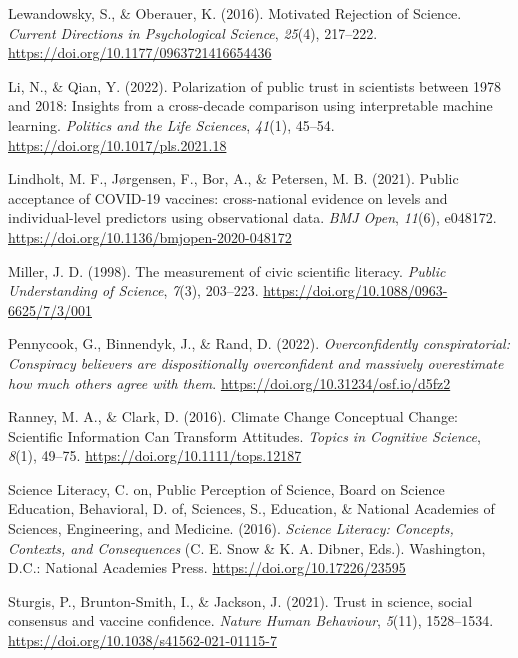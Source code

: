 \documentclass[
  doc,floatsintext]{apa6}
\newlength{\cslhangindent}
\newenvironment{CSLReferences}[2] %
 {\begin{list}{}{%
  \setlength{\itemindent}{0pt}
  \setlength{\leftmargin}{0pt}
  \setlength{\parsep}{0pt}
  \ifodd #1
   \setlength{\leftmargin}{\cslhangindent}
   \setlength{\itemindent}{-1\cslhangindent}
  \fi
  \setlength{\itemsep}{#2\baselineskip}}}
 {\end{list}}
\begin{document}
\begin{CSLReferences}{1}{0}
Lewandowsky, S., \& Oberauer, K. (2016). Motivated Rejection of Science. \emph{Current Directions in Psychological Science}, \emph{25}(4), 217--222. \url{https://doi.org/10.1177/0963721416654436}

Li, N., \& Qian, Y. (2022). Polarization of public trust in scientists between 1978 and 2018: Insights from a cross-decade comparison using interpretable machine learning. \emph{Politics and the Life Sciences}, \emph{41}(1), 45--54. \url{https://doi.org/10.1017/pls.2021.18}

Lindholt, M. F., Jørgensen, F., Bor, A., \& Petersen, M. B. (2021). Public acceptance of COVID-19 vaccines: cross-national evidence on levels and individual-level predictors using observational data. \emph{BMJ Open}, \emph{11}(6), e048172. \url{https://doi.org/10.1136/bmjopen-2020-048172}

Miller, J. D. (1998). The measurement of civic scientific literacy. \emph{Public Understanding of Science}, \emph{7}(3), 203--223. \url{https://doi.org/10.1088/0963-6625/7/3/001}

Pennycook, G., Binnendyk, J., \& Rand, D. (2022). \emph{Overconfidently conspiratorial: Conspiracy believers are dispositionally overconfident and massively overestimate how much others agree with them}. \url{https://doi.org/10.31234/osf.io/d5fz2}

Ranney, M. A., \& Clark, D. (2016). Climate Change Conceptual Change: Scientific Information Can Transform Attitudes. \emph{Topics in Cognitive Science}, \emph{8}(1), 49--75. \url{https://doi.org/10.1111/tops.12187}

Science Literacy, C. on, Public Perception of Science, Board on Science Education, Behavioral, D. of, Sciences, S., Education, \& National Academies of Sciences, Engineering, and Medicine. (2016). \emph{Science Literacy: Concepts, Contexts, and Consequences} (C. E. Snow \& K. A. Dibner, Eds.). Washington, D.C.: National Academies Press. \url{https://doi.org/10.17226/23595}

Sturgis, P., Brunton-Smith, I., \& Jackson, J. (2021). Trust in science, social consensus and vaccine confidence. \emph{Nature Human Behaviour}, \emph{5}(11), 1528--1534. \url{https://doi.org/10.1038/s41562-021-01115-7}


\end{CSLReferences}
\end{document}
